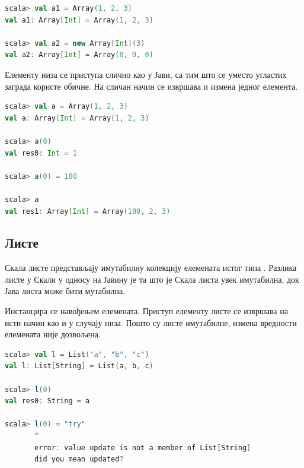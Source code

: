 \documentclass[12pt,oneside]{memoir}
\begin{document}
\begin{lstlisting}[language=Scala, caption={Инстанцирање низа у Скали}, label={lst:scala_coll_array_example}]
scala> val a1 = Array(1, 2, 3)
val a1: Array[Int] = Array(1, 2, 3)

scala> val a2 = new Array[Int](3)
val a2: Array[Int] = Array(0, 0, 0)
\end{lstlisting}


Елементу низа се приступа слично као у Јави, са тим што се уместо угластих заграда користе обичне. На сличан начин се извршава и измена једног елемента.

\begin{lstlisting}[language=Scala, caption={Приступ и измена елемента низа}, label={lst:scala_coll_array_get_set}]
scala> val a = Array(1, 2, 3)
val a: Array[Int] = Array(1, 2, 3)

scala> a(0)
val res0: Int = 1

scala> a(0) = 100

scala> a
val res1: Array[Int] = Array(100, 2, 3)
\end{lstlisting}

\subsection{Листе}
\label{subsec:scala_lists}

Скала листе представљају имутабилну колекцију елемената истог типа \cite{scala_prog}. Разлика листе у Скали у односу на Јавину је та што је Скала листа увек имутабилна, док Јава листа може бити мутабилна. 

Инстанцира се навођењем елемената. Приступ елементу листе се извршава на исти начин као и у случају низа. Пошто су листе имутабилне, измена вредности елемената није дозвољена.

\begin{lstlisting}[language=Scala, caption={Пример листе у Скали}, label={lst:scala_coll_lists_example}]
scala> val l = List("a", "b", "c")
val l: List[String] = List(a, b, c)

scala> l(0)
val res0: String = a

scala> l(0) = "try"
       ^
       error: value update is not a member of List[String]
       did you mean updated?
\end{lstlisting}
\end{document}

